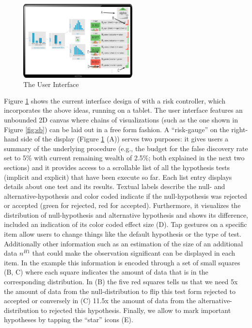 \begin{figure}
\begin{center}
\hspace*{-7.5ex}
\includegraphics[width=0.53\textwidth]{figures/risk_controller}
\end{center}
\vspace{-3.5ex}
\caption{The \system{} User Interface}
\vspace{-5.5ex}
\label{fig:riskcontroller}	
\end{figure}

Figure \ref{fig:riskcontroller}	shows the current interface design of \system{} with a risk controller, which incorporates the above ideas, running on a tablet. 
The user interface features an unbounded 2D canvas where chains of visualizations (such as the one shown in Figure \ref{fig:sb}) can be laid out in a free form fashion. 
A ``risk-gauge'' on the right-hand side of the display (Figure \ref{fig:riskcontroller} (A)) serves two purposes: 
it gives users a summary of the underlying procedure (e.g., the budget for the false discovery rate set to 5\% with current remaining wealth of 2.5\%; %
both explained in the next two sections) and it provides access to a scrollable list of all the hypothesis tests (implicit and explicit) that have been execute so far. 
Each list entry displays details about one test and its results.
Textual labels describe the null- and alternative-hypothesis and color coded \pvals  indicate if the null-hypothesis was rejected or accepted (green for rejected, red for accepted).  
Furthermore, it visualizes the distribution of null-hypothesis and alternative hypothesis and shows its difference, included an indication of its color coded effect size (D). 
Tap gestures on a specific item allow users to change things like the default hypothesis or the type of test.  
Additionally other information such as an estimation of the size of an additional data  $n^{H1}$ that could make the observation significant can be displayed in each item. 
In the example this information is encoded through a set of small squares (B, C) where each square indicates the amount of data that is in the corresponding distribution. In (B) the five red squares tells us that we need 5x the amount of data from the null-distribution to flip this test form rejected to accepted or conversely in (C) 11.5x the amount of data from the alternative-distribution to rejected this hypothesis. 
Finally, we allow to mark important hypotheses by tapping the ``star'' icons (E). 



